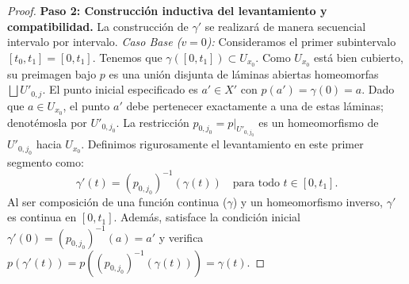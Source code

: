 \documentclass[11pt,a4paper]{article}
\theoremstyle{definition}
\theoremstyle{remark}
\numberwithin{equation}{section}
\begin{document}
\begin{proof}
\textbf{Paso 2: Construcción inductiva del levantamiento y compatibilidad.}
La construcción de $\gamma'$ se realizará de manera secuencial intervalo por intervalo.
\textit{Caso Base ($v=0$):} Consideramos el primer subintervalo $[t_0, t_1] = [0, t_1]$. Tenemos que $\gamma([0, t_1]) \subset U_{x_0}$. Como $U_{x_0}$ está bien cubierto, su preimagen bajo $p$ es una unión disjunta de láminas abiertas homeomorfas $\bigsqcup U'_{0,j}$. El punto inicial especificado es $a' \in X'$ con $p(a') = \gamma(0) = a$. Dado que $a \in U_{x_0}$, el punto $a'$ debe pertenecer exactamente a una de estas láminas; denotémosla por $U'_{0, j_0}$. La restricción $p_{0, j_0} = p|_{U'_{0, j_0}}$ es un homeomorfismo de $U'_{0, j_0}$ hacia $U_{x_0}$. Definimos rigurosamente el levantamiento en este primer segmento como:
\begin{equation}
\gamma'(t) = (p_{0, j_0})^{-1}(\gamma(t)) \quad \text{para todo } t \in [0, t_1].
\end{equation}
Al ser composición de una función continua ($\gamma$) y un homeomorfismo inverso, $\gamma'$ es continua en $[0, t_1]$. Además, satisface la condición inicial $\gamma'(0) = (p_{0, j_0})^{-1}(a) = a'$ y verifica $p(\gamma'(t)) = p( (p_{0, j_0})^{-1}(\gamma(t)) ) = \gamma(t)$.


\end{proof}
\end{document}
